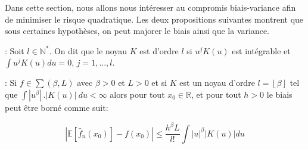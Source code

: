 \documentclass[
]{book}
\begin{document}
Dans cette section, nous allons nous intéresser au compromis biais-variance afin de minimiser le risque quadratique.
Les deux propositions suivantes montrent que sous certaines hypothèses, on peut majorer le biais ainsi que la variance.\newline

\begin{dfn} : Soit $l \in \mathbb{N^*}$. On dit que le noyau $K$ est d'ordre $l$ si $u^jK(u)$ est intégrable et $\int u^jK(u)du = 0$, $j = {1,...,l}$.\newline
\end{dfn}

\begin{prop}: Si $f \in \sum(\beta,L)$ avec $\beta > 0$ et $L > 0$ et si $K$ est un noyau d'ordre $l = \left\lfloor{\beta}\right\rfloor$ tel que $\int |{u}^{\beta}|\,.|{K(u)}|~du < \infty$ alors pour tout $x_0 \in \mathbb{R}$, et pour tout $h>0$ le biais peut être borné comme suit:

$$
|\mathbb{E}[\hat{f}_n(x_0)] - f(x_0)|\leqslant \frac{h^{\beta}L}{l!}\int|u|^{\beta}|K(u)|du
$$
\end{prop}
\end{document}

